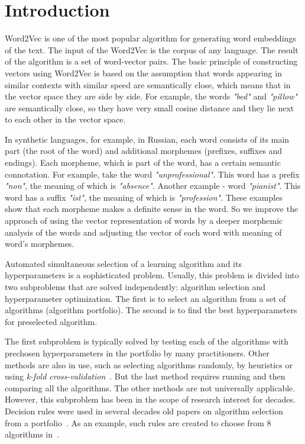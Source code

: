\documentclass{svproc}
\begin{document}
\section{Introduction}

Word2Vec is one of the most popular algorithm for generating word embeddings of the text. The input of the Word2Vec is the corpus of any language. The result of the algorithm is a set of word-vector pairs. The basic principle of constructing vectors using Word2Vec is based on the assumption that words appearing in similar contexts with similar speed are semantically close, which means that in the vector space they are side by side. For example, the words \emph{"bed"} and \emph{"pillow"} are semantically close, so they have very small cosine distance and they lie next to each other in the vector space.

In synthetic languages, for example, in Russian, each word consists of its main part (the root of the word) and additional morphemes (prefixes, suffixes and endings). Each morpheme, which is part of the word, has a certain semantic connotation. For example, take the word \emph{"unprofessional"}. This word has a prefix \emph{"non"}, the meaning of which is \emph{"absence"}. Another example - word \emph{"pianist"}. This word has a suffix \emph{"ist"}, the meaning of which is \emph{"profession"}. These examples show that each morpheme makes a definite sense in the word. So we improve the approach of using the vector representation of words by a deeper morphemic analysis of the words and adjusting the vector of each word with meaning of word's morphemes.











Automated simultaneous selection of a learning algorithm and its hyperparameters is a sophisticated problem. Usually, this problem is divided into two subproblems that are solved independently: algorithm selection and hyperparameter optimization. The first is to select an algorithm from a set of algorithms (algorithm portfolio). The second is to find the best hyperparameters for preselected algorithm.

The first subproblem is typically solved by testing each of the algorithms with prechosen hyperparameters in the portfolio by many practitioners. Other methods are also in use, such as selecting algorithms randomly, by heuristics or using \emph{k-fold cross-validation}~\cite{kfoldcv}. But the last method requires running and then comparing all the algorithms. The other methods are not universally applicable. However, this subproblem has been in the scope of research interest for decades. Decision rules were used in several decades old papers on algorithm selection from a portfolio~\cite{aha}. As an example, such rules are created to choose from 8 algorithms in~\cite{alism}.
\end{document}
